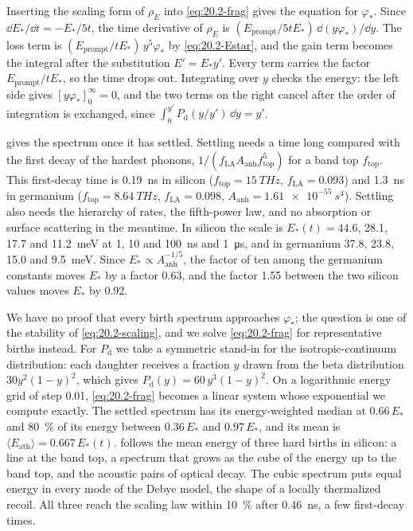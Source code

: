 \noindent Inserting the scaling form of $\rho_E$ into \cref{eq:20.2-frag} gives the equation for $\varphi_*$. Since $\dd E_*/\dd t = -E_*/5t$, the time derivative of $\rho_E$ is $(E_{\mathrm{prompt}}/5tE_*)\,\dd(y\varphi_*)/\dd y$. The loss term is $(E_{\mathrm{prompt}}/tE_*)\,y^5\varphi_*$ by \cref{eq:20.2-Estar}, and the gain term becomes the integral after the substitution $E' = E_*y'$. Every term carries the factor $E_{\mathrm{prompt}}/tE_*$, so the time drops out. Integrating over $y$ checks the energy: the left side gives $[y\varphi_*]_0^\infty = 0$, and the two terms on the right cancel after the order of integration is exchanged, since $\int_0^{y'}P_{\mathrm{d}}(y/y')\,\dd y = y'$.

 gives the spectrum once it has settled. Settling needs a time long compared with the first decay of the hardest phonons, $1/(f_{\mathrm{LA}}A_{\mathrm{anh}}f_{\mathrm{top}}^5)$ for a band top $f_{\mathrm{top}}$. This first-decay time is \SI{0.19}{ns} in silicon ($f_{\mathrm{top}} = \SI{15}{THz}$, $f_{\mathrm{LA}} = 0.093$) and \SI{1.3}{ns} in germanium ($f_{\mathrm{top}} = \SI{8.64}{THz}$, $f_{\mathrm{LA}} = 0.098$, $A_{\mathrm{anh}} = \SI{1.61e-55}{s^4}$). Settling also needs the hierarchy of rates, the fifth-power law, and no absorption or surface scattering in the meantime. In silicon the scale is $E_*(t) = 44.6$, 28.1, 17.7 and \SI{11.2}{meV} at 1, 10 and \SI{100}{ns} and \SI{1}{\micro s}, and in germanium 37.8, 23.8, 15.0 and \SI{9.5}{meV}. Since $E_* \propto A_{\mathrm{anh}}^{-1/5}$, the factor of ten among the germanium constants moves $E_*$ by a factor 0.63, and the factor 1.55 between the two silicon values moves $E_*$ by 0.92.

We have no proof that every birth spectrum approaches $\varphi_*$; the question is one of the stability of \cref{eq:20.2-scaling}, and we solve \cref{eq:20.2-frag} for representative births instead. For $P_{\mathrm{d}}$ we take a symmetric stand-in for the isotropic-continuum distribution: each daughter receives a fraction $y$ drawn from the beta distribution $30y^2(1 - y)^2$, which gives $P_{\mathrm{d}}(y) = 60\,y^3(1 - y)^2$. On a logarithmic energy grid of step 0.01, \cref{eq:20.2-frag} becomes a linear system whose exponential we compute exactly. The settled spectrum has its energy-weighted median at $0.66\,E_*$ and \SI{80}{\percent} of its energy between $0.36\,E_*$ and $0.97\,E_*$, and its mean is $\langle E_{\mathrm{ath}}\rangle = 0.667\,E_*(t)$.  follows the mean energy of three hard births in silicon: a line at the band top, a spectrum that grows as the cube of the energy up to the band top, and the acoustic pairs of optical decay. The cubic spectrum puts equal energy in every mode of the Debye model, the shape of a locally thermalized recoil. All three reach the scaling law within \SI{10}{\percent} after \SI{0.46}{ns}, a few first-decay times.

